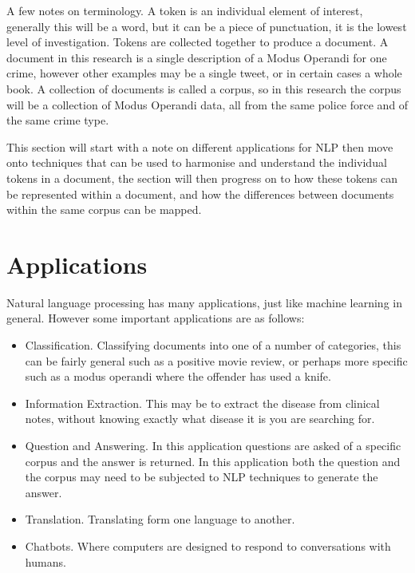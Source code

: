 A few notes on terminology. A token is an individual element of interest, generally this will be a word, but it can be a piece of punctuation, it is the lowest level of investigation. Tokens are collected together to produce a document. A document in this research is a single description of a Modus Operandi for one crime, however other examples may be a single tweet, or in certain cases a whole book. A collection of documents is called a corpus, so in this research the corpus will be a collection of Modus Operandi data,  all from the same police force and of the same crime type.

This section will start with a note on different applications for NLP then move onto techniques that can be used to harmonise and understand the individual tokens in a document, the section will then progress on to how these tokens can be represented within a document, and how the differences between documents within the same corpus can be mapped. 

\section{Applications}

Natural language processing has many applications, just like machine learning in general. However some important applications are as follows:

\begin{itemize}

\item{Classification.} Classifying documents into one of a number of categories, this can be fairly general such as a positive movie review, or perhaps more specific such as a modus operandi where the offender has used a knife.

\item{Information Extraction.} This may be to extract the disease from clinical notes, without knowing exactly what disease it is you are searching for.

\item{Question and Answering.} In this application questions are asked of a specific corpus and the answer is returned. In this application both the question and the corpus may need to be subjected to NLP techniques to generate the answer.

\item{Translation.} Translating form one language to another.

\item{Chatbots.} Where computers are designed to respond to conversations with humans.

\end{itemize}


